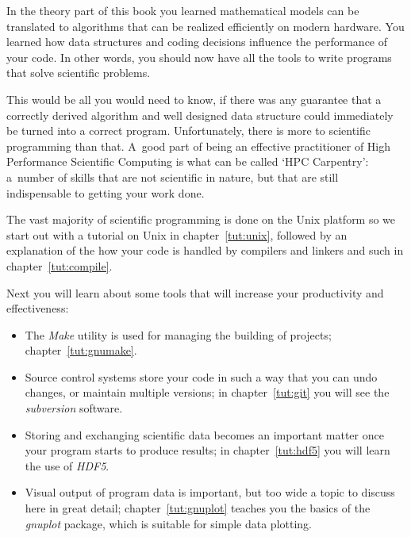 
In the theory part of this book you learned mathematical models can be
translated to algorithms that can be realized efficiently on modern
hardware. You learned how data structures and coding decisions
influence the performance of your code. In other words, you should now
have all the tools to write programs that solve scientific problems.

This would be all you would need to know,
if there was any guarantee that a correctly derived algorithm and
well designed data structure could immediately be turned into a
correct program.
Unfortunately, there is more to scientific programming than that.
A~good part of being an effective practitioner
of High Performance Scientific Computing is
what can be called `HPC Carpentry':
a~number of skills that are not scientific in nature,
but that are still indispensable to getting your work done.

The vast majority of
scientific programming is done on the Unix platform so we start out
with a tutorial on Unix in chapter~\ref{tut:unix}, followed by an
explanation of the how your code is handled by compilers and linkers
and such in chapter~\ref{tut:compile}.

Next you will learn about some tools that will increase your
productivity and effectiveness: 
\begin{itemize}
\item The \emph{Make} utility is used for managing the building of
  projects; chapter~\ref{tut:gnumake}.
\item Source control systems store your code in such a way that you
  can undo changes, or maintain multiple versions; in
  chapter~\ref{tut:git} you will see the \emph{subversion} software.
\item Storing and exchanging scientific data becomes an important
  matter once your program starts to produce results; in
  chapter~\ref{tut:hdf5} you will learn the use of \emph{HDF5}.
\item Visual output of program data is important, but too wide a topic
  to discuss here in great detail; chapter~\ref{tut:gnuplot} teaches
  you the basics of the \emph{gnuplot} package, which is suitable for
  simple data plotting.
\end{itemize}

